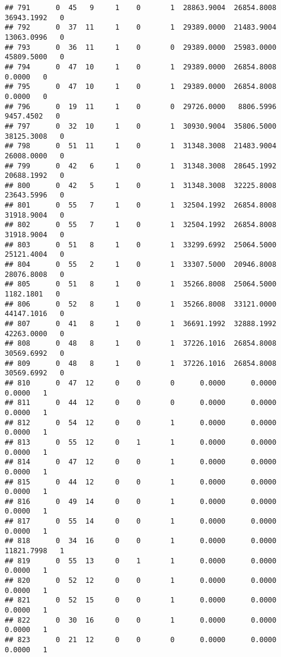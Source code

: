 \documentclass[
]{article}
\begin{document}
\begin{enumerate}
\begin{verbatim}
## 791      0  45   9     1    0       1  28863.9004  26854.8008  36943.1992   0
## 792      0  37  11     1    0       1  29389.0000  21483.9004  13063.0996   0
## 793      0  36  11     1    0       0  29389.0000  25983.0000  45809.5000   0
## 794      0  47  10     1    0       1  29389.0000  26854.8008      0.0000   0
## 795      0  47  10     1    0       1  29389.0000  26854.8008      0.0000   0
## 796      0  19  11     1    0       0  29726.0000   8806.5996   9457.4502   0
## 797      0  32  10     1    0       1  30930.9004  35806.5000  38125.3008   0
## 798      0  51  11     1    0       1  31348.3008  21483.9004  26008.0000   0
## 799      0  42   6     1    0       1  31348.3008  28645.1992  20688.1992   0
## 800      0  42   5     1    0       1  31348.3008  32225.8008  23643.5996   0
## 801      0  55   7     1    0       1  32504.1992  26854.8008  31918.9004   0
## 802      0  55   7     1    0       1  32504.1992  26854.8008  31918.9004   0
## 803      0  51   8     1    0       1  33299.6992  25064.5000  25121.4004   0
## 804      0  55   2     1    0       1  33307.5000  20946.8008  28076.8008   0
## 805      0  51   8     1    0       1  35266.8008  25064.5000   1182.1801   0
## 806      0  52   8     1    0       1  35266.8008  33121.0000  44147.1016   0
## 807      0  41   8     1    0       1  36691.1992  32888.1992  42263.0000   0
## 808      0  48   8     1    0       1  37226.1016  26854.8008  30569.6992   0
## 809      0  48   8     1    0       1  37226.1016  26854.8008  30569.6992   0
## 810      0  47  12     0    0       0      0.0000      0.0000      0.0000   1
## 811      0  44  12     0    0       0      0.0000      0.0000      0.0000   1
## 812      0  54  12     0    0       1      0.0000      0.0000      0.0000   1
## 813      0  55  12     0    1       1      0.0000      0.0000      0.0000   1
## 814      0  47  12     0    0       1      0.0000      0.0000      0.0000   1
## 815      0  44  12     0    0       1      0.0000      0.0000      0.0000   1
## 816      0  49  14     0    0       1      0.0000      0.0000      0.0000   1
## 817      0  55  14     0    0       1      0.0000      0.0000      0.0000   1
## 818      0  34  16     0    0       1      0.0000      0.0000  11821.7998   1
## 819      0  55  13     0    1       1      0.0000      0.0000      0.0000   1
## 820      0  52  12     0    0       1      0.0000      0.0000      0.0000   1
## 821      0  52  15     0    0       1      0.0000      0.0000      0.0000   1
## 822      0  30  16     0    0       1      0.0000      0.0000      0.0000   1
## 823      0  21  12     0    0       0      0.0000      0.0000      0.0000   1

\end{verbatim}
\end{enumerate}
\end{document}
